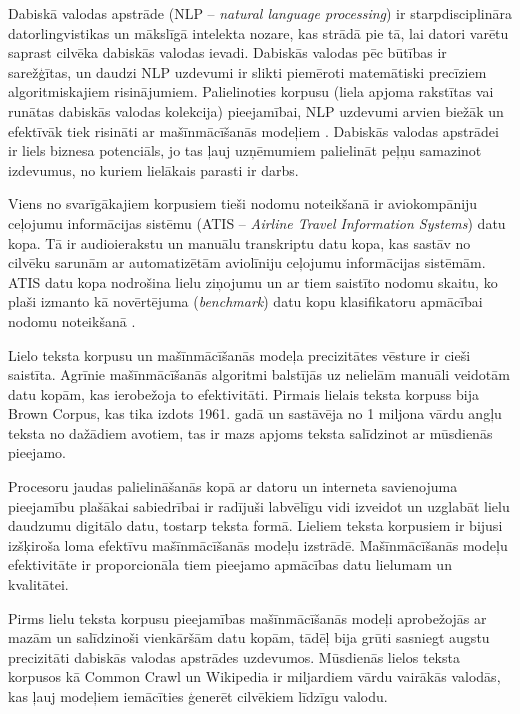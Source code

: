 Dabiskā valodas apstrāde (NLP -- \textit{natural language processing}) ir starpdisciplināra datorlingvistikas un mākslīgā intelekta nozare, kas strādā pie tā, lai datori varētu saprast cilvēka dabiskās valodas ievadi. Dabiskās valodas pēc būtības ir sarežģītas, un daudzi NLP uzdevumi ir slikti piemēroti matemātiski precīziem algoritmiskajiem risinājumiem. Palielinoties korpusu (liela apjoma rakstītas vai runātas dabiskās valodas kolekcija) pieejamībai, NLP uzdevumi arvien biežāk un efektīvāk tiek risināti ar mašīnmācīšanās modeļiem \cite{nlp2018}. Dabiskās valodas apstrādei ir liels biznesa potenciāls, jo tas ļauj uzņēmumiem palielināt peļņu samazinot izdevumus, no kuriem lielākais parasti ir darbs. %


Viens no svarīgākajiem korpusiem tieši nodomu noteikšanā ir aviokompāniju ceļojumu informācijas sistēmu (ATIS -- \textit{Airline Travel Information Systems}) datu kopa. Tā ir audioierakstu un manuālu transkriptu datu kopa, kas sastāv no cilvēku sarunām ar automatizētām aviolīniju ceļojumu informācijas sistēmām. ATIS datu kopa nodrošina lielu ziņojumu un ar tiem saistīto nodomu skaitu, ko plaši izmanto kā novērtējuma (\textit{benchmark}) datu kopu klasifikatoru apmācībai nodomu noteikšanā \cite{atis1990}.


Lielo teksta korpusu un mašīnmācīšanās modeļa precizitātes vēsture ir cieši saistīta. Agrīnie mašīnmācīšanās algoritmi balstījās uz nelielām manuāli veidotām datu kopām, kas ierobežoja to efektivitāti. Pirmais lielais teksta korpuss bija Brown Corpus, kas tika izdots 1961. gadā un sastāvēja no 1 miljona vārdu angļu teksta no dažādiem avotiem, tas ir mazs apjoms teksta salīdzinot ar mūsdienās pieejamo.

Procesoru jaudas palielināšanās kopā ar datoru un interneta savienojuma pieejamību plašākai sabiedrībai ir radījuši labvēlīgu vidi izveidot un uzglabāt lielu daudzumu digitālo datu, tostarp teksta formā. Lieliem teksta korpusiem ir bijusi izšķiroša loma efektīvu mašīnmācīšanās modeļu izstrādē. Mašīnmācīšanās modeļu efektivitāte ir proporcionāla tiem pieejamo apmācības datu lielumam un kvalitātei. %

Pirms lielu teksta korpusu pieejamības mašīnmācīšanās modeļi aprobežojās ar mazām un salīdzinoši vienkāršām datu kopām, tādēļ bija grūti sasniegt augstu precizitāti dabiskās valodas apstrādes uzdevumos. Mūsdienās lielos teksta korpusos kā Common Crawl un Wikipedia ir miljardiem vārdu vairākās valodās, kas ļauj modeļiem iemācīties ģenerēt cilvēkiem līdzīgu valodu.

